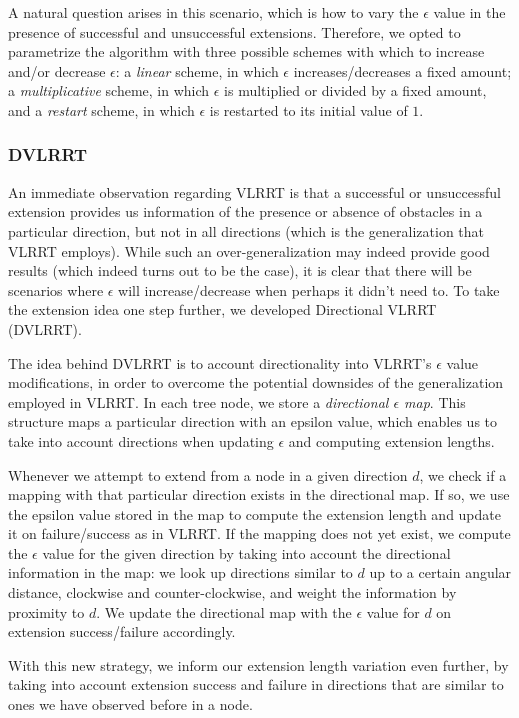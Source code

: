 \documentclass[10pt,twoside,twocolumn]{article}
\begin{document}
A natural question arises in this scenario, which is how to vary the $\epsilon$ value in the presence of successful and unsuccessful 
extensions. Therefore, we opted to parametrize the algorithm with three possible schemes with which to increase and/or decrease $\epsilon$:
a \emph{linear} scheme, in which $\epsilon$ increases/decreases a fixed amount; a \emph{multiplicative} scheme, in which $\epsilon$ is multiplied or divided by a fixed amount, and a \emph{restart} scheme, in which $\epsilon$ is restarted to its initial value of $1$.

\subsubsection{DVLRRT}
An immediate observation regarding VLRRT is that a successful or unsuccessful extension provides us information of the
presence or absence of obstacles in a particular direction, but not in all directions (which is the generalization that VLRRT employs). 
While such an over-generalization may indeed provide good results (which indeed turns out to be the case), it is clear that there
will be scenarios where $\epsilon$ will increase/decrease when perhaps it didn't need to. To take the extension idea one step
further, we developed Directional VLRRT (DVLRRT).

The idea behind DVLRRT is to account directionality into VLRRT's $\epsilon$ value modifications, in order to overcome the potential
downsides of the generalization employed in VLRRT. In each tree node, we store a \emph{directional $\epsilon$ map}. This 
structure maps a particular direction with an epsilon value, which enables us to take into account directions when updating $\epsilon$
and computing extension lengths.

Whenever we attempt to extend from a node in a given direction $d$, we check if a mapping with that particular direction exists in the directional map.
If so, we use the epsilon value stored in the map to compute the extension length and update it on failure/success as in VLRRT. If the mapping does not yet exist, we compute the $\epsilon$ value for the given direction by taking into account the directional information in the map: we look up directions similar to $d$ up to a certain angular distance, clockwise and counter-clockwise, and weight the information by proximity to $d$. We update the directional map with the $\epsilon$ value for $d$ on extension success/failure accordingly.

With this new strategy, we inform our extension length variation even further, by taking into account extension success and failure in directions that are similar to ones we have observed before in a node.
\end{document}

